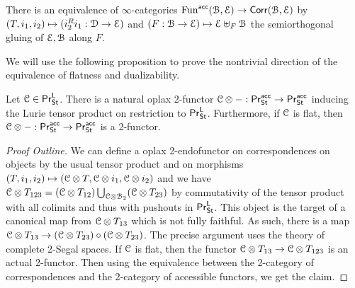 \begin{proposition}
    There is an equivalence of $\infty$-categories $\mathrm{Fun}^{\mathsf{acc}}(\EuScript{B},\EuScript{E})\to\mathsf{Corr}(\EuScript{B},\EuScript{E})$ by $(T, i_{1},i_{2})\mapsto (i_{2}^{R}i_{1}:\EuScript{D}\to\EuScript{E})$ and $(F:\EuScript{B}\to\EuScript{E})\mapsto \EuScript{E}\uplus_{F}\EuScript{B}$ the semiorthogonal gluing of $\EuScript{E},\EuScript{B}$ along $F$. 
\end{proposition}
We will use the following proposition to prove the nontrivial direction of the equivalence of flatness and dualizability. 
\begin{proposition}
    Let $\EuScript{C}\in\mathsf{Pr}^{\mathsf{L}}_{\mathsf{St}}$. There is a natural oplax 2-functor $\EuScript{C}\otimes-:\mathsf{Pr}^{\mathsf{acc}}_{\mathsf{St}}\to\mathsf{Pr}^{\mathsf{acc}}_{\mathsf{St}}$ inducing the Lurie tensor product on restriction to $\mathsf{Pr}^{\mathsf{L}}_{\mathsf{St}}$. Furthermore, if $\EuScript{C}$ is flat, then $\EuScript{C}\otimes-:\mathsf{Pr}^{\mathsf{acc}}_{\mathsf{St}}\to\mathsf{Pr}^{\mathsf{acc}}_{\mathsf{St}}$ is a 2-functor. 
\end{proposition}
\begin{proof}[Proof Outline]
    We can define a oplax 2-endofunctor on correspondences on objects by the usual tensor product and on morphisms $(T,i_{1},i_{2})\mapsto (\EuScript{C}\otimes T, \EuScript{C}\otimes i_{1},\EuScript{C}\otimes i_{2})$ and we have $\EuScript{C}\otimes T_{123}=(\EuScript{C}\otimes T_{12})\bigcup_{\EuScript{C}\otimes\EuScript{B}_{2}}(\EuScript{C}\otimes T_{23})$ by commutativity of the tensor product with all colimits and thus with pushouts in $\mathsf{Pr}^{\mathsf{L}}_{\mathsf{St}}$. This object is the target of a canonical map from $\EuScript{C}\otimes T_{13}$ which is not fully faithful. As such, there is a map $\EuScript{C}\otimes T_{13}\to(\EuScript{C}\otimes T_{23})\circ(\EuScript{C}\otimes T_{23})$. The precise argument uses the theory of complete 2-Segal spaces. If $\EuScript{C}$ is flat, then the functor $\EuScript{C}\otimes T_{13}\to\EuScript{C}\otimes T_{123}$ is an actual 2-functor. Then using the equivalence between the 2-category of correspondences and the 2-category of accessible functors, we get the claim. 
\end{proof}

